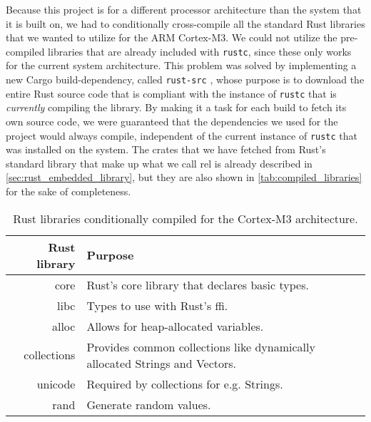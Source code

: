Because this project is for a different processor architecture than the system that it is built on, we had to conditionally cross-compile all the standard Rust libraries that we wanted to utilize for the ARM Cortex-M3.
We could not utilize the pre-compiled libraries that are already included with \texttt{rustc}, since these only works for the current system architecture.
This problem was solved by implementing a new Cargo build-dependency, called \texttt{rust-src} \cite{github:rust_src}, whose purpose is to download the entire Rust source code that is compliant with the instance of \texttt{rustc} that is \emph{currently} compiling the library.
By making it a task for each build to fetch its own source code, we were guaranteed that the dependencies we used for the project would always compile, independent of the current instance of \texttt{rustc} that was installed on the system.
The crates that we have fetched from Rust's standard library that make up what we call \gls{rel} is already described in \autoref{sec:rust_embedded_library}, but they are also shown in \autoref{tab:compiled_libraries} for the sake of completeness.


\begin{table}[ht]
\begin{center}
\begin{tabular}{r|p{8cm}}
\textbf{Rust library} & \textbf{Purpose} \\
\hline
core        & Rust's core library that declares basic types. \\
libc        & Types to use with Rust's \gls{ffi}. \\
alloc       & Allows for heap-allocated variables. \\
collections & Provides common collections like dynamically allocated Strings and Vectors. \\
unicode     & Required by collections for e.g. Strings. \\
rand        & Generate random values. \\
\hline
\end{tabular}
\caption{Rust libraries conditionally compiled for the Cortex-M3 architecture.}
\label{tab:compiled_libraries}
\end{center}
\end{table}


